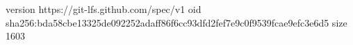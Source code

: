version https://git-lfs.github.com/spec/v1
oid sha256:bda58cbe13325de092252adaff86f6cc93dfd2fef7e9c0f9539fcae9efc3e6d5
size 1603
